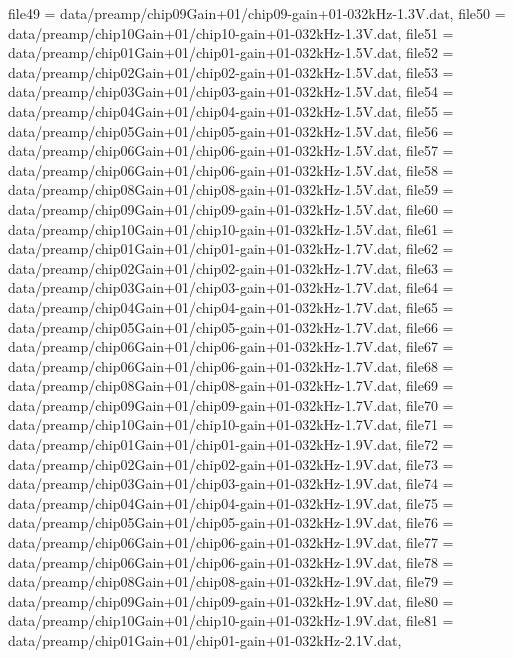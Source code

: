 {    file49         = data/preamp/chip09Gain+01/chip09-gain+01-032kHz-1.3V.dat,
    file50         = data/preamp/chip10Gain+01/chip10-gain+01-032kHz-1.3V.dat,
    file51         = data/preamp/chip01Gain+01/chip01-gain+01-032kHz-1.5V.dat,
    file52         = data/preamp/chip02Gain+01/chip02-gain+01-032kHz-1.5V.dat,
    file53         = data/preamp/chip03Gain+01/chip03-gain+01-032kHz-1.5V.dat,
    file54         = data/preamp/chip04Gain+01/chip04-gain+01-032kHz-1.5V.dat,
    file55         = data/preamp/chip05Gain+01/chip05-gain+01-032kHz-1.5V.dat,
    file56         = data/preamp/chip06Gain+01/chip06-gain+01-032kHz-1.5V.dat,
    file57         = data/preamp/chip06Gain+01/chip06-gain+01-032kHz-1.5V.dat,
    file58         = data/preamp/chip08Gain+01/chip08-gain+01-032kHz-1.5V.dat,
    file59         = data/preamp/chip09Gain+01/chip09-gain+01-032kHz-1.5V.dat,
    file60         = data/preamp/chip10Gain+01/chip10-gain+01-032kHz-1.5V.dat,
    file61         = data/preamp/chip01Gain+01/chip01-gain+01-032kHz-1.7V.dat,
    file62         = data/preamp/chip02Gain+01/chip02-gain+01-032kHz-1.7V.dat,
    file63         = data/preamp/chip03Gain+01/chip03-gain+01-032kHz-1.7V.dat,
    file64         = data/preamp/chip04Gain+01/chip04-gain+01-032kHz-1.7V.dat,
    file65         = data/preamp/chip05Gain+01/chip05-gain+01-032kHz-1.7V.dat,
    file66         = data/preamp/chip06Gain+01/chip06-gain+01-032kHz-1.7V.dat,
    file67         = data/preamp/chip06Gain+01/chip06-gain+01-032kHz-1.7V.dat,
    file68         = data/preamp/chip08Gain+01/chip08-gain+01-032kHz-1.7V.dat,
    file69         = data/preamp/chip09Gain+01/chip09-gain+01-032kHz-1.7V.dat,
    file70         = data/preamp/chip10Gain+01/chip10-gain+01-032kHz-1.7V.dat,
    file71         = data/preamp/chip01Gain+01/chip01-gain+01-032kHz-1.9V.dat,
    file72         = data/preamp/chip02Gain+01/chip02-gain+01-032kHz-1.9V.dat,
    file73         = data/preamp/chip03Gain+01/chip03-gain+01-032kHz-1.9V.dat,
    file74         = data/preamp/chip04Gain+01/chip04-gain+01-032kHz-1.9V.dat,
    file75         = data/preamp/chip05Gain+01/chip05-gain+01-032kHz-1.9V.dat,
    file76         = data/preamp/chip06Gain+01/chip06-gain+01-032kHz-1.9V.dat,
    file77         = data/preamp/chip06Gain+01/chip06-gain+01-032kHz-1.9V.dat,
    file78         = data/preamp/chip08Gain+01/chip08-gain+01-032kHz-1.9V.dat,
    file79         = data/preamp/chip09Gain+01/chip09-gain+01-032kHz-1.9V.dat,
    file80         = data/preamp/chip10Gain+01/chip10-gain+01-032kHz-1.9V.dat,
    file81         = data/preamp/chip01Gain+01/chip01-gain+01-032kHz-2.1V.dat,
}
